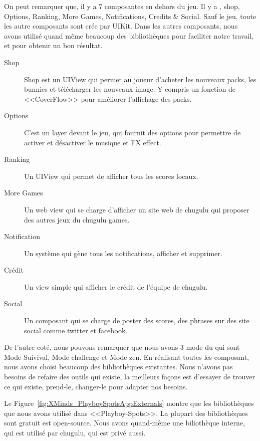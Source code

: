 On peut remarquer que, il y a 7 composantes en dehors du jeu. Il y a , shop, Options, Ranking, More Games, Notifications, Credits \& Social. Sauf le jeu, toute les autre composants sont crée par UIKit. Dans les autres composants, nous avons utilisé quand même beaucoup des bibliothèques pour faciliter notre travail, et pour obtenir un bon résultat.

\begin{description}
	\item[Shop] Shop est un UIView qui permet au joueur d'acheter les nouveaux packs, les bunnies et télécharger les nouveaux image. Y compris un fonction de <<CoverFlow>> pour améliorer l'affichage des packs.
	\item[Options] C'est un layer devant le jeu, qui fournit des options pour permettre de activer et désactiver le musique et FX effect.
	\item[Ranking] Un UIView qui permet de afficher tous les scores locaux.
	\item[More Games] Un web view qui se charge d'afficher un site web de chugulu qui proposer des autres jeux du chugulu games.
	\item[Notification] Un système qui gène tous les notifications, afficher et supprimer.
	\item[Crédit] Un view simple qui afficher le crédit de l'équipe de chugulu.
	\item[Social] Un composant qui se charge de poster des scores, des phrases sur des site social comme twitter et facebook.
\end{description}


De l'autre coté, nous pouvons remarquer que nous avons 3 mode du qui sont Mode Suivival, Mode challenge et Mode zen. En réalisant toutes les composant, nous avons choisi beaucoup des bibliothèques existantes. Nous n'avons pas besoins de refaire des outils qui existe, la meilleurs façons est d'essayer de trouver ce qui existe, prend-le, changer-le pour adapter nos besoins.

Le Figure~\ref{fig:XMinds_PlayboySpotsAppExternals} montre que les bibliothèques que nous avons utilisé dans <<Playboy-Spots>>. La plupart des bibliothèques sont gratuit est open-source. Nous avons quand-même une biliothèque interne, qui est utilisé par chugulu, qui est privé aussi. 


